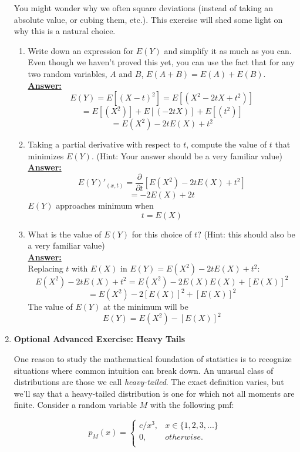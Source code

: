 \documentclass[12pt,a4paper]{article}
\numberwithin{equation}{subsection}
\begin{document}
\begin{enumerate}
You might wonder why we often square deviations (instead of taking an absolute value, or cubing them, etc.).  This exercise will shed some light on why this is a natural choice.

\begin{enumerate}
\item Write down an expression for $E(Y)$ and simplify it as much as you can.  Even though we haven't proved this yet, you can use the fact that for any two random variables, $A$ and $B$, $E(A + B) = E(A) + E(B)$.
\\
\textbf{\underline{Answer:}}
$$E(Y) = E[(X - t)^2] = E[(X^2 -2tX + t^2)]$$
$$= E[(X^2)] + E[(-2tX)] + E[(t^2)]$$
$$= E(X^2) - 2tE(X) + t^2$$
\item Taking a partial derivative with respect to $t$, compute the value of $t$ that minimizes $E(Y)$.  (Hint: Your answer should be a very familiar value)
\\
\newpage
\textbf{\underline{Answer:}}
$$E(Y)'_{(x, t)} = \frac{\partial }{\partial t} [E(X^2) - 2tE(X) + t^2]$$
$$= - 2E(X) + 2t$$
$E(Y)$ approaches minimum when
$$t = E(X)$$
\item What is the value of $E(Y)$ for this choice of $t$?
(Hint: this should also be a very familiar value)
\\
\textbf{\underline{Answer:}}
\\
Replacing $t$ with $E(X)$ in $E(Y) = E(X^2) - 2tE(X) + t^2$:
$$E(X^2) - 2tE(X) + t^2 = E(X^2) - 2E(X)E(X) + [E(X)]^2$$
$$ = E(X^2) - 2[E(X)]^2 + [E(X)]^2$$
The value of $E(Y)$ at the minimum will be 
$$E(Y) = E(X^2) - [E(X)]^2$$

\end{enumerate}

\item \textbf{Optional Advanced Exercise: Heavy Tails}

One reason to study the mathematical foundation of statistics is to recognize situations where common intuition can break down.  An unusual class of distributions are those we call \textit{heavy-tailed}.  The exact definition varies, but we'll say that a heavy-tailed distribution is one for which not all moments are finite.  Consider a random variable $M$ with the following pmf:

$$p_M(x) = \begin{cases}
c/x^3, &x \in \{1,2,3,...\}\\
0, &otherwise.\\
\end{cases}
$$


\end{enumerate}
\end{document}
